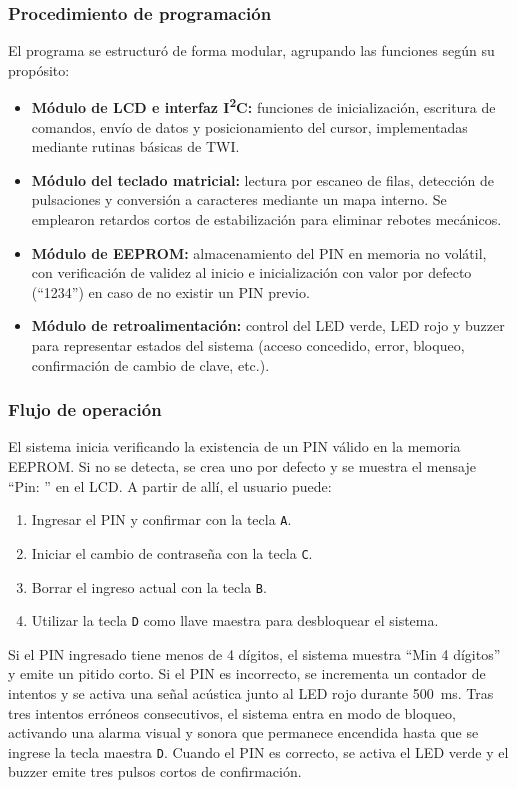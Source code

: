\subsubsection{Procedimiento de programación}

El programa se estructuró de forma modular, agrupando las funciones según su propósito:
\begin{itemize}
    \item \textbf{Módulo de LCD e interfaz I\textsuperscript{2}C:} funciones de inicialización, escritura de comandos, envío de datos y posicionamiento del cursor, 
    implementadas mediante rutinas básicas de TWI.
    \item \textbf{Módulo del teclado matricial:} lectura por escaneo de filas, detección de pulsaciones y conversión a caracteres mediante un mapa interno. 
    Se emplearon retardos cortos de estabilización para eliminar rebotes mecánicos.
    \item \textbf{Módulo de EEPROM:} almacenamiento del PIN en memoria no volátil, con verificación de validez al inicio 
    e inicialización con valor por defecto (“1234”) en caso de no existir un PIN previo.
    \item \textbf{Módulo de retroalimentación:} control del LED verde, LED rojo y buzzer para representar estados del sistema 
    (acceso concedido, error, bloqueo, confirmación de cambio de clave, etc.).
\end{itemize}

\subsubsection{Flujo de operación}

El sistema inicia verificando la existencia de un PIN válido en la memoria EEPROM. 
Si no se detecta, se crea uno por defecto y se muestra el mensaje “Pin: ” en el LCD.  
A partir de allí, el usuario puede:
\begin{enumerate}
    \item Ingresar el PIN y confirmar con la tecla \texttt{A}.  
    \item Iniciar el cambio de contraseña con la tecla \texttt{C}.  
    \item Borrar el ingreso actual con la tecla \texttt{B}.  
    \item Utilizar la tecla \texttt{D} como llave maestra para desbloquear el sistema.
\end{enumerate}

Si el PIN ingresado tiene menos de 4 dígitos, el sistema muestra “Min 4 dígitos” y emite un pitido corto.  
Si el PIN es incorrecto, se incrementa un contador de intentos y se activa una señal acústica junto al LED rojo durante 500~ms.  
Tras tres intentos erróneos consecutivos, el sistema entra en modo de bloqueo, 
activando una alarma visual y sonora que permanece encendida hasta que se ingrese la tecla maestra \texttt{D}.  
Cuando el PIN es correcto, se activa el LED verde y el buzzer emite tres pulsos cortos de confirmación.

